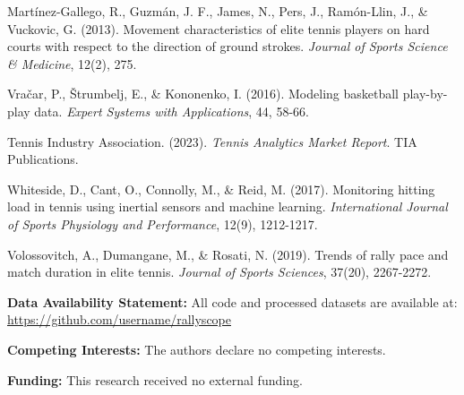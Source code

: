 \documentclass[11pt,a4paper]{article}
\begin{document}
\begin{thebibliography}{99}
Martínez-Gallego, R., Guzmán, J. F., James, N., Pers, J., Ramón-Llin, J., \& Vuckovic, G. (2013). Movement characteristics of elite tennis players on hard courts with respect to the direction of ground strokes. \textit{Journal of Sports Science \& Medicine}, 12(2), 275.

Vračar, P., Štrumbelj, E., \& Kononenko, I. (2016). Modeling basketball play-by-play data. \textit{Expert Systems with Applications}, 44, 58-66.

Tennis Industry Association. (2023). \textit{Tennis Analytics Market Report}. TIA Publications.

Whiteside, D., Cant, O., Connolly, M., \& Reid, M. (2017). Monitoring hitting load in tennis using inertial sensors and machine learning. \textit{International Journal of Sports Physiology and Performance}, 12(9), 1212-1217.

Volossovitch, A., Dumangane, M., \& Rosati, N. (2019). Trends of rally pace and match duration in elite tennis. \textit{Journal of Sports Sciences}, 37(20), 2267-2272.

\end{thebibliography}

\vspace{1cm}

\noindent\textbf{Data Availability Statement:} All code and processed datasets are available at: \url{https://github.com/username/rallyscope}

\noindent\textbf{Competing Interests:} The authors declare no competing interests.

\noindent\textbf{Funding:} This research received no external funding.
\end{document}

